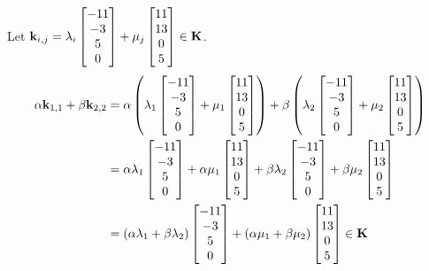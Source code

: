 \documentclass[a4paper]{article}
\begin{document}
Let \({\bf k}_{i,j}=\lambda_i\begin{bmatrix}-11\\-3\\5\\0\end{bmatrix}+\mu_j\begin{bmatrix}11\\13\\0\\5\end{bmatrix}\in{\bf K}\).
\[\begin{aligned}
	\alpha{\bf k}_{1,1}+\beta{\bf k}_{2,2}&=\alpha\left(\lambda_1\begin{bmatrix}-11\\-3\\5\\0\end{bmatrix}+\mu_1\begin{bmatrix}11\\13\\0\\5\end{bmatrix}\right)+\beta\left(\lambda_2\begin{bmatrix}-11\\-3\\5\\0\end{bmatrix}+\mu_2\begin{bmatrix}11\\13\\0\\5\end{bmatrix}\right)\\
&=\alpha\lambda_1\begin{bmatrix}-11\\-3\\5\\0\end{bmatrix}+\alpha\mu_1\begin{bmatrix}11\\13\\0\\5\end{bmatrix}+\beta\lambda_2\begin{bmatrix}-11\\-3\\5\\0\end{bmatrix}+\beta\mu_2\begin{bmatrix}11\\13\\0\\5\end{bmatrix}\\
&=(\alpha\lambda_1+\beta\lambda_2)\begin{bmatrix}-11\\-3\\5\\0\end{bmatrix}+(\alpha\mu_1+\beta\mu_2)\begin{bmatrix}11\\13\\0\\5\end{bmatrix}\in{\bf K}
\end{aligned}\]
\end{document}
